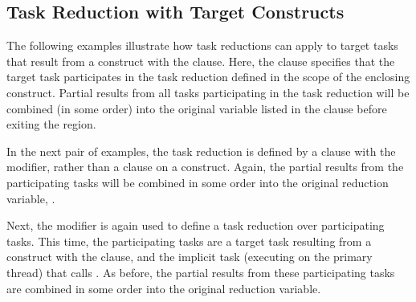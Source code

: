 


\subsection{Task Reduction with Target Constructs}
\label{subsec:target_task_reduction}


The following examples illustrate how task reductions can apply to target tasks
that result from a  construct with the 
clause. Here, the  clause specifies that the target task
participates in the task reduction defined in the scope of the enclosing
 construct. Partial results from all tasks participating in the
task reduction will be combined (in some order) into the original variable
listed in the  clause before exiting the 
region. 


\clearpage

In the next pair of examples, the task reduction is defined by a
 clause with the  modifier, rather than a
 clause on a  construct. Again, the
partial results from the participating tasks will be combined in some order
into the original reduction variable, .



Next, the  modifier is again used to define a task reduction over
participating tasks. This time, the participating tasks are a target task
resulting from a  construct with the  clause,
and the implicit task (executing on the primary thread) that calls
. As before, the partial results from these participating
tasks are combined in some order into the original reduction variable.

